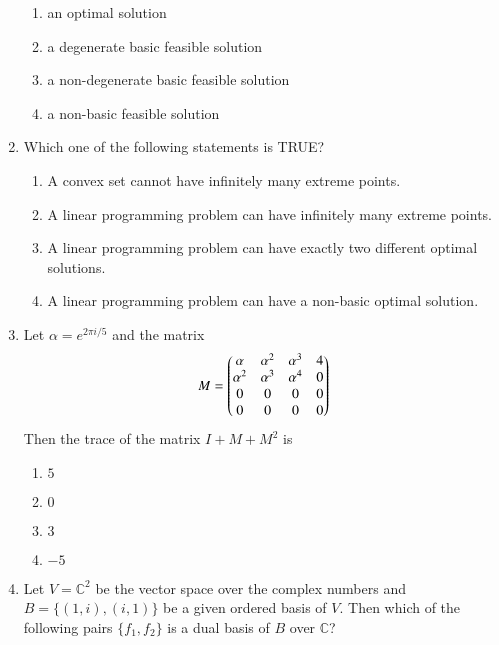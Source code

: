 \documentclass[journal]{IEEEtran}
\numberwithin{equation}{enumi}
\numberwithin{figure}{enumi}
\begin{document}
\begin{enumerate}
\begin{enumerate}
  \item an optimal solution
  \item a degenerate basic feasible solution
  \item a non-degenerate basic feasible solution
  \item a non-basic feasible solution
\end{enumerate}



\item
Which one of the following statements is TRUE?
\hfill{}

\begin{enumerate}
  \item A convex set cannot have infinitely many extreme points.
  \item A linear programming problem can have infinitely many extreme points.
  \item A linear programming problem can have exactly two different optimal solutions.
  \item A linear programming problem can have a non-basic optimal solution.
\end{enumerate}


\item
Let $\alpha = e^{2 \pi i/5}$ and the matrix
\begin{align}
M = \begin{pmatrix}
\alpha & \alpha^2 & \alpha^3 & 4 \\
\alpha^2 & \alpha^3 & \alpha^4 & 0 \\
0 & 0 & 0 & 0 \\
0 & 0 & 0 & 0
\end{pmatrix}
\end{align}
Then the trace of the matrix $I + M + M^2$ is
\hfill{}
\begin{multicols}{4}
\begin{enumerate}
  \item $5$
  \item $0$
  \item $3$
  \item $-5$
\end{enumerate}
\end{multicols}

\item
Let $V = \mathbb{C}^2$ be the vector space over the complex numbers and $B = \{(1, i), (i, 1)\}$ be a given ordered basis of $V$. Then which of the following pairs $\{f_1, f_2\}$ is a dual basis of $B$ over $\mathbb{C}$?
\hfill{}


\end{enumerate}
\end{document}

